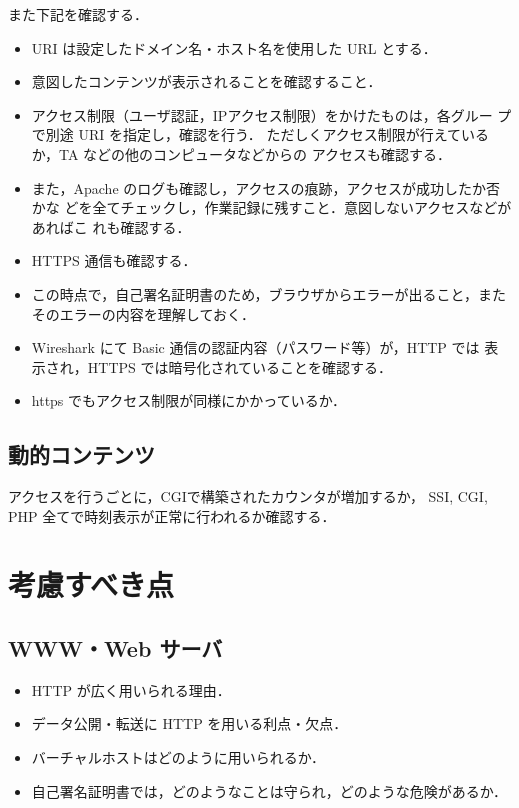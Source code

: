 また下記を確認する．
\begin{itemize}
 \item URI は設定したドメイン名・ホスト名を使用した URL とする．
 \item 意図したコンテンツが表示されることを確認すること．
 \item アクセス制限（ユーザ認証，IPアクセス制限）をかけたものは，各グルー
       プで別途 URI を指定し，確認を行う．
 ただしくアクセス制限が行えているか，TA などの他のコンピュータなどからの
 アクセスも確認する．
 \item  また，Apache のログも確認し，アクセスの痕跡，アクセスが成功したか否かな
 どを全てチェックし，作業記録に残すこと．意図しないアクセスなどがあればこ
 れも確認する．
 \item HTTPS 通信も確認する．
 \item この時点で，自己署名証明書のため，ブラウザからエラーが出ること，またそのエラーの内容を理解しておく．
  \item Wireshark にて Basic 通信の認証内容（パスワード等）が，HTTP では
       表示され，HTTPS では暗号化されていることを確認する．
\item https でもアクセス制限が同様にかかっているか．
\end{itemize}

\subsection*{動的コンテンツ}
アクセスを行うごとに，CGIで構築されたカウンタが増加するか，
SSI, CGI, PHP 全てで時刻表示が正常に行われるか確認する．


\section{考慮すべき点}

\subsection*{WWW・Web サーバ}

\begin{itemize}
 \item HTTP が広く用いられる理由．
 \item データ公開・転送に HTTP を用いる利点・欠点．
 \item バーチャルホストはどのように用いられるか．
 \item 自己署名証明書では，どのようなことは守られ，どのような危険があるか．
\end{itemize}

